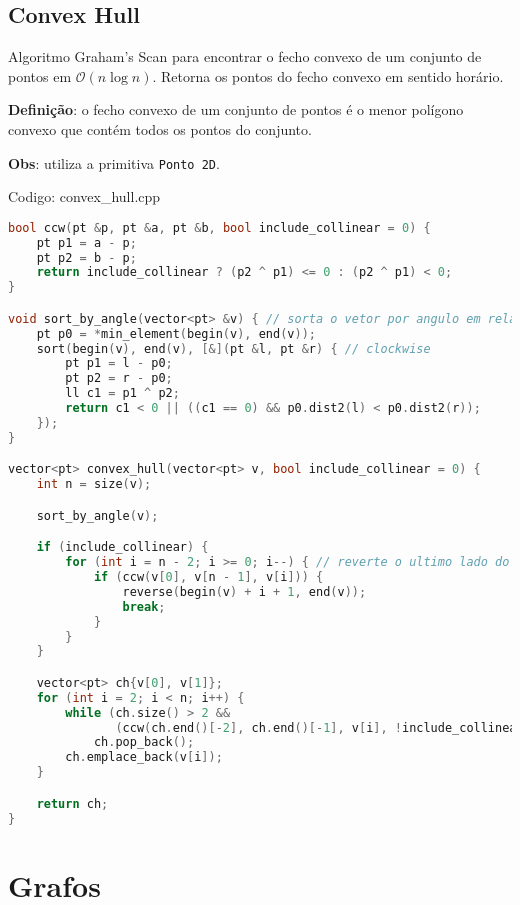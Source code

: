 \documentclass[10pt, a4paper, oneside]{book}
\begin{document}
\section{Convex Hull}


Algoritmo Graham's Scan para encontrar o fecho convexo de um conjunto de pontos em $\mathcal{O}(n \log n)$. Retorna os pontos do fecho convexo em sentido horário.



\textbf{Definição}: o fecho convexo de um conjunto de pontos é o menor polígono convexo que contém todos os pontos do conjunto.



\textbf{Obs}: utiliza a primitiva \texttt{Ponto 2D}. 

\hfill

Codigo: convex\_hull.cpp

\begin{lstlisting}[language=C++]
bool ccw(pt &p, pt &a, pt &b, bool include_collinear = 0) {
    pt p1 = a - p;
    pt p2 = b - p;
    return include_collinear ? (p2 ^ p1) <= 0 : (p2 ^ p1) < 0;
}

void sort_by_angle(vector<pt> &v) { // sorta o vetor por angulo em relacao ao pivo
    pt p0 = *min_element(begin(v), end(v));
    sort(begin(v), end(v), [&](pt &l, pt &r) { // clockwise
        pt p1 = l - p0;
        pt p2 = r - p0;
        ll c1 = p1 ^ p2;
        return c1 < 0 || ((c1 == 0) && p0.dist2(l) < p0.dist2(r));
    });
}

vector<pt> convex_hull(vector<pt> v, bool include_collinear = 0) {
    int n = size(v);

    sort_by_angle(v);

    if (include_collinear) {
        for (int i = n - 2; i >= 0; i--) { // reverte o ultimo lado do poligono
            if (ccw(v[0], v[n - 1], v[i])) {
                reverse(begin(v) + i + 1, end(v));
                break;
            }
        }
    }

    vector<pt> ch{v[0], v[1]};
    for (int i = 2; i < n; i++) {
        while (ch.size() > 2 &&
               (ccw(ch.end()[-2], ch.end()[-1], v[i], !include_collinear)))
            ch.pop_back();
        ch.emplace_back(v[i]);
    }

    return ch;
}
\end{lstlisting}
\hfill

\newpage

%
%
%
%

\chapter{Grafos}
\end{document}
